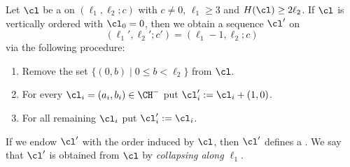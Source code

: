 \begin{lemma}
\label{lem:L1Coll}
Let $\cl$ be a {\mes} on $(\ell_1,\ell_2;c)$ with 
$c\not=0$, $\ell_1\geq3$ and $H(\cl)\geq2\ell_2$. 
If $\cl$ is vertically ordered with $\cl_0=0$, 
then we obtain a sequence $\cl'$ on 
$$
(\ell_1',\ell_2';c')=(\ell_1-1,\ell_2;c)
$$ 
via the following procedure:
\begin{enumerate}
    \item[(i)] Remove the set 
    $\{(0,b)\mid0\leq b<\ell_2\}$ from $\cl$.
    \item[(ii)] For every $\cl_i=(a_i,b_i)\in\CH^-$ 
    put $\cl'_i:=\cl_i+(1,0)$.
    \item[(iii)] For all remaining $\cl_i$ put 
    $\cl_i':=\cl_i$.
\end{enumerate}
If we endow $\cl'$ with the order induced by $\cl$, 
then $\cl'$ defines a {\mes}. We say that $\cl'$ is 
obtained from $\cl$ by {\em collapsing along $\ell_1$}.
\end{lemma}

